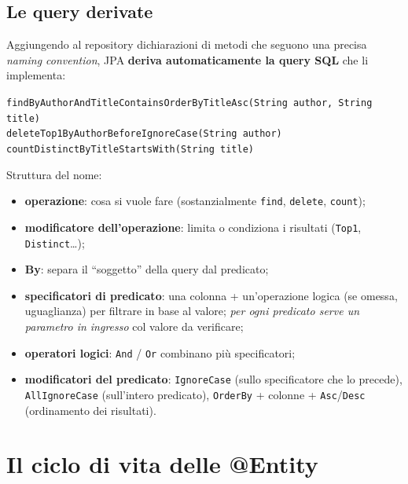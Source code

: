 \subsection{Le query derivate}
Aggiungendo al repository dichiarazioni di metodi che seguono una precisa
\emph{naming convention}, JPA \textbf{deriva automaticamente la query SQL} che li implementa:
\begin{center}
\texttt{findByAuthorAndTitleContainsOrderByTitleAsc(String author, String title)}\\
\texttt{deleteTop1ByAuthorBeforeIgnoreCase(String author)}\\
\texttt{countDistinctByTitleStartsWith(String title)}
\end{center}
Struttura del nome:
\begin{itemize}
  \item \textbf{operazione}: cosa si vuole fare (sostanzialmente \texttt{find},
        \texttt{delete}, \texttt{count});
  \item \textbf{modificatore dell'operazione}: limita o condiziona i risultati
        (\texttt{Top1}, \texttt{Distinct}\dots);
  \item \textbf{By}: separa il ``soggetto'' della query dal predicato;
  \item \textbf{specificatori di predicato}: una colonna + un'operazione logica (se omessa,
        uguaglianza) per filtrare in base al valore; \emph{per ogni predicato serve un
        parametro in ingresso} col valore da verificare;
  \item \textbf{operatori logici}: \texttt{And} / \texttt{Or} combinano pi\`u specificatori;
  \item \textbf{modificatori del predicato}: \texttt{IgnoreCase} (sullo specificatore che lo
        precede), \texttt{AllIgnoreCase} (sull'intero predicato), \texttt{OrderBy} + colonne
        + \texttt{Asc}/\texttt{Desc} (ordinamento dei risultati).
\end{itemize}

\section{Il ciclo di vita delle @Entity}

